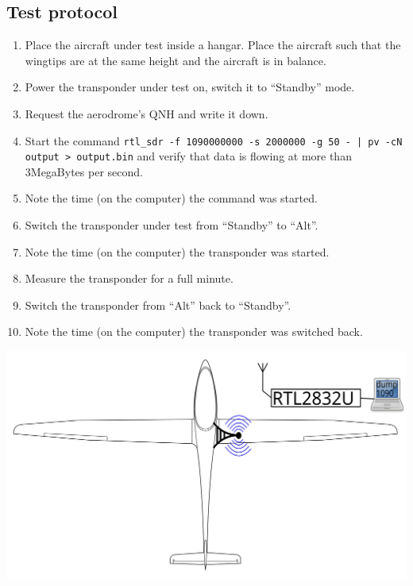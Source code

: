 \documentclass[a4paper]{article}
\begin{document}
\begin{landscape}
\section{Test protocol}

\begin{enumerate}
\item Place the aircraft under test inside a hangar. Place the aircraft such that the wingtips are at the same height and the aircraft is in balance.
\item Power the transponder under test on, switch it to ``Standby'' mode.
\item Request the aerodrome's QNH and write it down.
\item Start the command \texttt{{rtl\_sdr -f 1090000000 -s 2000000 -g 50 - | pv -cN output > output.bin}} and verify that data is flowing at more than 3MegaBytes per second.
\item Note the time (on the computer) the command was started.
\item Switch the transponder under test from ``Standby'' to ``Alt''.
\item Note the time (on the computer) the transponder was started.
\item Measure the transponder for a full minute.
\item Switch the transponder from ``Alt'' back to ``Standby''.
\item Note the time (on the computer) the transponder was switched back.
\end{enumerate}

\includegraphics[width=\textwidth]{setup}
\end{landscape}



\end{document}
